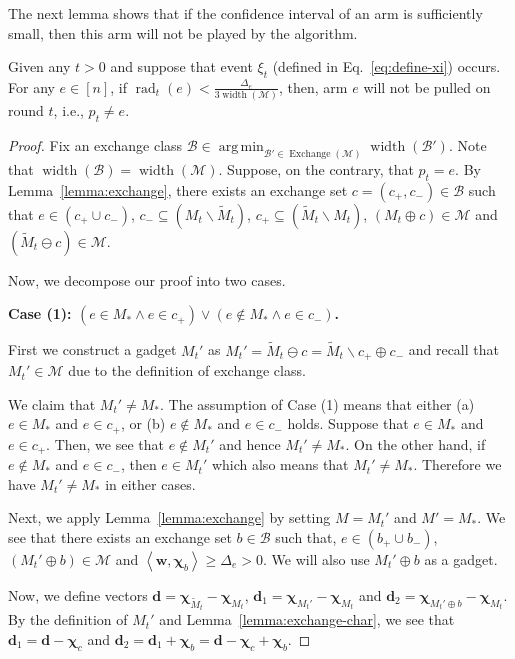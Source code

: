 \documentclass{article}
\newcommand{\M}{\mathcal M}
\newcommand{\B}{\mathcal B}
\newcommand{\del}{\backslash}
\DeclareMathOperator{\rank}{width}
\DeclareMathOperator{\rad}{rad}
\DeclareMathOperator*{\argmin}{arg\,min}
\DeclareMathOperator{\Exchange}{Exchange}
\newcommand{\inn}[1]{\left\langle #1 \right\rangle}
\renewcommand{\vec}[1]{\boldsymbol{#1}}
\begin{document}
The next lemma shows that if the confidence interval of an arm is sufficiently small, then this arm will not be played by the algorithm. 
\begin{lemma}
\label{lemma:key-technical}
Given any $t>0$ and suppose that event $\xi_t$ (defined in Eq.~\eqref{eq:define-xi})  occurs.
For any $e\in [n]$, if $\rad_t(e) < \frac{\Delta_e}{3\rank(\M)}$, then, arm $e$ will not be pulled on round $t$, i.e., $p_t\not= e$.
\end{lemma}

\begin{proof}
Fix an exchange class $\B\in \argmin_{\B'\in \Exchange(\M)} \rank(\B')$.
Note that $\rank(\B) = \rank(\M)$.
Suppose, on the contrary, that $p_t = e$.
By Lemma~\ref{lemma:exchange}, there exists an exchange set $c=(c_+,c_-) \in \B$
such that $e\in (c_+\cup c_-)$, $c_- \subseteq (M_t \del \tilde M_t)$, $c_+ \subseteq (\tilde M_t \del M_t)$, $(M_t\oplus c) \in \M$ and $(\tilde M_t \ominus c) \in \M$.


Now, we decompose our proof into two cases.

\textbf{Case (1): $(e \in M_* \wedge e\in c_+) \vee (e \not \in M_* \wedge e\in c_-)$.}

First we construct a gadget $M_t'$ as $M_t' = \tilde M_t \ominus c = \tilde M_t \del c_+ \oplus c_-$ and recall that $M_t' \in \M$ due to the definition of exchange class.

We claim that $M_t'\not= M_*$.
The assumption of Case (1) means that either (a) $e\in M_*$ and $e\in c_+$, or (b) $e\not \in M_*$ and $e\in c_-$ holds.
Suppose that $e\in M_*$ and $e\in c_+$.
Then, we see that $e\not\in M_t'$ and hence $M_t'\not=M_*$.
On the other hand, if $e\not \in M_*$ and $e\in c_-$, then $e\in M_t'$ which also means that $M_t'\not= M_*$.
Therefore we have $M_t'\not=M_*$ in either cases.


Next, we apply Lemma~\ref{lemma:exchange} by setting $M=M_t'$ and $M'=M_*$.
We see that there exists an exchange set $b\in \B$ such that, $e\in (b_+\cup b_-)$, $(M_t' \oplus b) \in \M$ and
 $\inn{\vec w, \vec \chi_b} \ge \Delta_e > 0$.
We will also use $M_t'\oplus b$ as a gadget.

Now, we define vectors $\vec d = \vec \chi_{\tilde M_t} - \vec \chi_{M_t}$, $\vec d_1 = \vec\chi_{M_t'}-\vec\chi_{M_t}$ and $\vec d_2 = \vec\chi_{M_t'\oplus b}-\vec\chi_{M_t}$.
By the definition of $M_t'$ and Lemma~\ref{lemma:exchange-char}, we see that $\vec d_1 = \vec d - \vec \chi_{c}$ and $\vec d_2 = \vec d_1+\vec \chi_b = \vec d-\vec \chi_c+\vec \chi_b$.



\end{proof}
\end{document}
